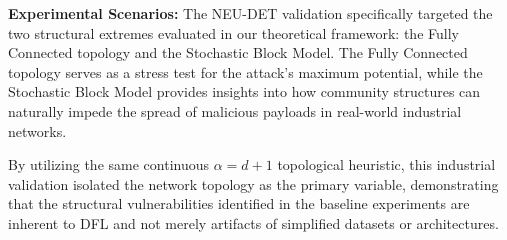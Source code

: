 \textbf{Experimental Scenarios:}
The NEU-DET validation specifically targeted the two structural extremes evaluated in our theoretical framework: the Fully Connected topology and the Stochastic Block Model. The Fully Connected topology serves as a stress test for the attack's maximum potential, while the Stochastic Block Model provides insights into how community structures can naturally impede the spread of malicious payloads in real-world industrial networks.

By utilizing the same continuous $\alpha = d + 1$ topological heuristic, this industrial validation isolated the network topology as the primary variable, demonstrating that the structural vulnerabilities identified in the baseline experiments are inherent to DFL and not merely artifacts of simplified datasets or architectures.